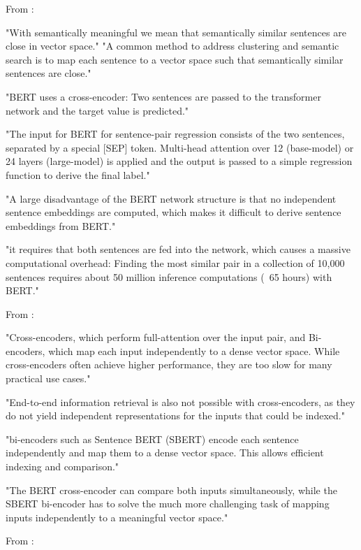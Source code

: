 From \parencite{reimers2019sentence_bert_sentence_embeddings_using_siamese_bert_networks} :

"With semantically meaningful we mean that semantically similar sentences are close in vector space."
"A common method to address clustering and semantic search is to map each sentence to a vector space such that semantically similar sentences are close."

"BERT uses a cross-encoder: Two sentences are passed to the transformer network and the target value is predicted."

"The input for BERT for sentence-pair regression consists of the two sentences, separated by a special [SEP] token. Multi-head attention over 12 (base-model) or 24 layers (large-model) is applied and the output is passed to a simple regression function to derive the final label."

"A large disadvantage of the BERT network structure is that no independent sentence embeddings are computed, which makes it difficult to derive sentence embeddings from BERT."

"it requires that both sentences are fed into the network, which causes a massive computational overhead: Finding the most similar pair in a collection of 10,000 sentences requires about 50 million inference computations (~65 hours) with BERT."

From \parencite{thakur2021augmented_sbert_data_augmentation_method_improving_bi_encoders_pairwise_sentence_scoring_tasks}:

"Cross-encoders, which perform full-attention over the input pair, and Bi-encoders, which map each input independently to a dense vector space. While cross-encoders often achieve higher performance, they are too slow for many practical use cases."

"End-to-end information retrieval is also not possible with cross-encoders, as they do not yield independent representations for the inputs that could be indexed."

"bi-encoders such as Sentence BERT (SBERT) encode each sentence independently and map them to a dense vector space. This allows efficient indexing and comparison."

"The BERT cross-encoder can compare both inputs simultaneously, while the SBERT bi-encoder has to solve the much more challenging task of mapping inputs independently to a meaningful vector space."

From \parencite{nogueira2019passage_re_ranking_with_bert}:

